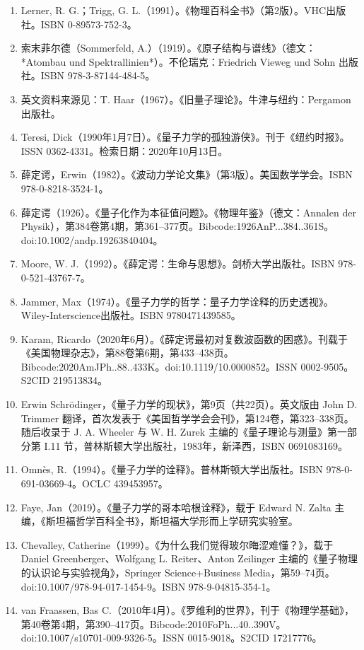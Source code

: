 \begin{enumerate}
\item Lerner, R. G.；Trigg, G. L.（1991）。《物理百科全书》（第2版）。VHC出版社。ISBN 0-89573-752-3。
\item 索末菲尔德（Sommerfeld, A.）（1919）。《原子结构与谱线》（德文：*Atombau und Spektrallinien*）。不伦瑞克：Friedrich Vieweg und Sohn 出版社。ISBN 978-3-87144-484-5。
\item 英文资料来源见：T. Haar（1967）。《旧量子理论》。牛津与纽约：Pergamon出版社。
\item Teresi, Dick（1990年1月7日）。《量子力学的孤独游侠》。刊于《纽约时报》。ISSN 0362-4331。检索日期：2020年10月13日。
\item 薛定谔，Erwin（1982）。《波动力学论文集》（第3版）。美国数学学会。ISBN 978-0-8218-3524-1。
\item 薛定谔（1926）。《量子化作为本征值问题》。《物理年鉴》（德文：Annalen der Physik），第384卷第4期，第361–377页。Bibcode:1926AnP...384..361S。doi:10.1002/andp.19263840404。
\item Moore, W. J.（1992）。《薛定谔：生命与思想》。剑桥大学出版社。ISBN 978-0-521-43767-7。
\item Jammer, Max（1974）。《量子力学的哲学：量子力学诠释的历史透视》。Wiley-Interscience出版社。ISBN 9780471439585。
\item Karam, Ricardo（2020年6月）。《薛定谔最初对复数波函数的困惑》。刊载于《美国物理杂志》，第88卷第6期，第433–438页。Bibcode:2020AmJPh..88..433K。doi:10.1119/10.0000852。ISSN 0002-9505。S2CID 219513834。
\item Erwin Schrödinger，《量子力学的现状》，第9页（共22页）。英文版由 John D. Trimmer 翻译，首次发表于《美国哲学学会会刊》，第124卷，第323–338页。随后收录于 J. A. Wheeler 与 W. H. Zurek 主编的《量子理论与测量》第一部分第 I.11 节，普林斯顿大学出版社，1983年，新泽西，ISBN 0691083169。
\item Omnès, R.（1994）。《量子力学的诠释》。普林斯顿大学出版社。ISBN 978-0-691-03669-4。OCLC 439453957。
\item Faye, Jan（2019）。《量子力学的哥本哈根诠释》，载于 Edward N. Zalta 主编，《斯坦福哲学百科全书》，斯坦福大学形而上学研究实验室。
\item Chevalley, Catherine（1999）。《为什么我们觉得玻尔晦涩难懂？》，载于 Daniel Greenberger、Wolfgang L. Reiter、Anton Zeilinger 主编的《量子物理的认识论与实验视角》，Springer Science+Business Media，第59–74页。doi:10.1007/978-94-017-1454-9。ISBN 978-9-04815-354-1。
\item van Fraassen, Bas C.（2010年4月）。《罗维利的世界》，刊于《物理学基础》，第40卷第4期，第390–417页。Bibcode:2010FoPh...40..390V。doi:10.1007/s10701-009-9326-5。ISSN 0015-9018。S2CID 17217776。

\end{enumerate}
